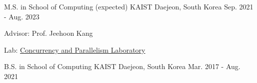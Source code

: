

\begin{cventries}

  \cventry
    {M.S. in School of Computing (expected)} %
    {KAIST} %
    {Daejeon, South Korea} %
    {Sep. 2021 - Aug. 2023} %
    {
      \begin{cvitems} %
        \item {Advisor: Prof. Jeehoon Kang}
        \item {Lab: \href{https://cp.kaist.ac.kr/}{Concurrency and Parallelism Laboratory} }
      \end{cvitems}
    }

  \cventry
    {B.S. in School of Computing} %
    {KAIST} %
    {Daejeon, South Korea} %
    {Mar. 2017 - Aug. 2021} %
    {
    }
\end{cventries}
